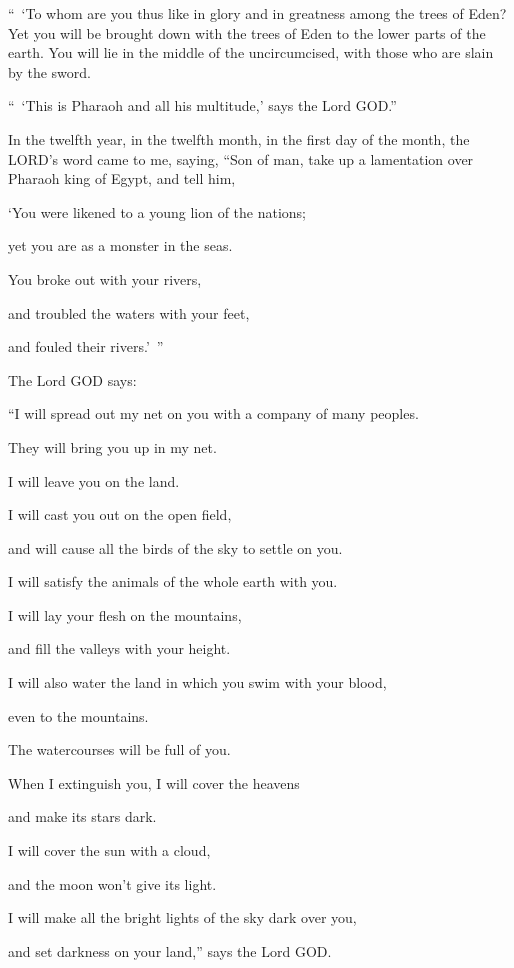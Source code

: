 \myverse{}“ ‘To whom are you thus like in glory and in greatness among
the trees of Eden? Yet you will be brought down with the trees of Eden to the lower parts of the earth.
You will lie in the middle of the uncircumcised, with those who are slain by the sword.

“ ‘This is Pharaoh and all his multitude,’ says the Lord GOD.”


\mychapter{} \myverse*{}In the twelfth year, in the twelfth month, in the first day of
the month, the LORD’s word came to me, saying,
\myverse{}“Son of man, take up a lamentation over Pharaoh king of Egypt, and tell him,

‘You were likened to a young lion of the nations;

yet you are as a monster in the seas.

You broke out with your rivers,

and troubled the waters with your feet,

and fouled their rivers.’ ”

\myverse{}The Lord GOD says:

“I will spread out my net on you with a company of many peoples.

They will bring you up in my net.

\myverse{}I will leave you on the land.

I will cast you out on the open field,

and will cause all the birds of the sky to settle on you.

I will satisfy the animals of the whole earth with you.

\myverse{}I will lay your flesh on the mountains,

and fill the valleys with your height.

\myverse{}I will also water the land in which you swim with your blood,

even to the mountains.

The watercourses will be full of you.

\myverse{}When I extinguish you, I will cover the heavens

and make its stars dark.

I will cover the sun with a cloud,

and the moon won’t give its light.

\myverse{}I will make all the bright lights of the sky dark over you,

and set darkness on your land,” says the Lord GOD.

